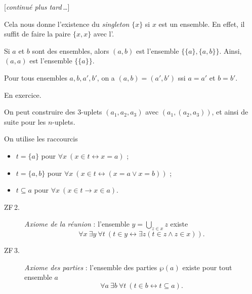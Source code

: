 \documentclass[./main]{subfiles}
\begin{document}
  [\textit{continué plus tard\,\ldots}]

  \begin{rmk}
    Cela nous donne l'existence du \textit{singleton} $\{x\}$ si $x$ est un ensemble. En effet, il suffit de faire la paire $\{x,x\}$ avec l'\pairaxiom.
  \end{rmk}

  \begin{defn}
    Si $a$ et $b$ sont des ensembles, alors $(a,b)$ est l'ensemble  $\{\{a\} , \{a,b\}\}$.
    Ainsi, $(a, a)$ est l'ensemble $\{\{a\} \} $.
  \end{defn}

  \begin{lem}
    Pour tous ensembles $a,b,a', b'$, on a  $(a,b) = (a', b')$ ssi  $a = a'$ et $b = b'$.
  \end{lem}
  \begin{prv}
    En exercice.
  \end{prv}

  \begin{defn}
    On peut construire des $3$-uplets $(a_1, a_2, a_3)$ avec $(a_1, (a_2, a_3))$, et ainsi de suite pour les $n$-uplets.
  \end{defn}

  \begin{nota}
    On utilise les raccourcis 
    \begin{itemize}
      \item $t = \{a\}$ pour $\forall x \: (x \in t \leftrightarrow x = a)$ ;
      \item $t = \{a,b\}$ pour $\forall x \: (x \in t \leftrightarrow (x = a \lor x = b))$ ;
      \item $t \subseteq a$ pour $\forall x \: (x \in t \to x \in a)$.
    \end{itemize}
  \end{nota}

  \begin{description}
    \item[ZF\,2.\label{ZF2}] \textit{Axiome de la réunion} : l'ensemble $y = \bigcup_{z \in x} z$ existe 
      \[
      \forall x \: \exists y \: \forall t\: (t \in y \leftrightarrow\exists z (t \in z \land z \in x))
      .\]
  \end{description}

  \begin{description}
    \item[ZF\,3.\label{ZF3}]
      \textit{Axiome des parties} : l'ensemble des parties $\wp(a)$ existe pour tout ensemble $a$
      \[
      \forall a \: \exists b \: \forall t \: (t \in b \leftrightarrow t \subseteq a)
      .\]
  \end{description}
\end{document}
